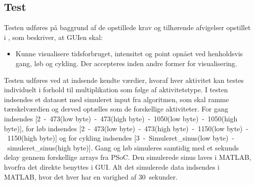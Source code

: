 \subsection{Test}
Testen udføres på baggrund af de opstillede krav og tilhørende afvigelser opstillet i , som beskriver, at GUIen skal:
\begin{itemize}
	\item Kunne visualisere tidsforbruget, intensitet og point opnået ved henholdsvis gang, løb og cykling. Der accepteres inden andre former for visualisering.
\end{itemize}

Testen udføres ved at indsende kendte værdier, hvoraf hver aktivitet kan testes individuelt i forhold til multiplikation som følge af aktivitetstype. I testen indsendes et datasæt med simuleret input fra algoritmen, som skal ramme tærskelværdien og derved optælles som de forskellige aktiviteter. For gang indsendes [2~-~473(low byte)~-~473(high byte)~-~1050(low byte)~-~1050(high byte)], for løb indsendes [2~-~473(low byte)~-~473(high byte)~-~1150(low byte)~-~1150(high byte)] og for cykling indsendes [3~-~Simuleret\_sinus(low byte)~-~simuleret\_sinus(high byte)]. Gang og løb simuleres samtidig med et sekunds delay gennem forskellige arrays fra PSoC. Den simulerede sinus laves i MATLAB, hvorfra det direkte benyttes i GUI. Alt det simulerede data indsendes i MATLAB, hvor det hver har en varighed af 30~sekunder.


